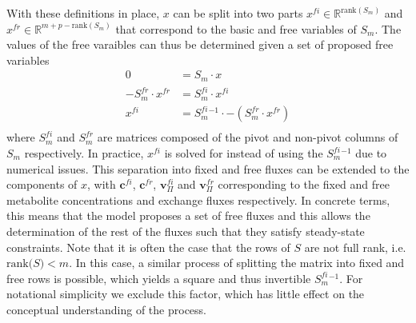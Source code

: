 \documentclass[10pt,letterpaper]{article}
\newcommand{\bc}{\mathbf{c}}
\newcommand{\bv}{\mathbf{v}}
\begin{document}
With these definitions in place, $x$ can be split into two parts $x^{fi} \in \mathbb{R}^{\text{rank}(S_m)}$ and $x^{fr}\in \mathbb{R}^{m+p-\text{rank}(S_m)}$ that correspond to the basic and free variables of $S_m$.
The values of the free varaibles can thus be determined given a set of proposed free variables
\begin{align}
    0 &= S_m\cdot x\\
    -S_m^{fr}\cdot x^{fr} &= S_m^{fi}\cdot  x^{fi}\\
    x^{fi} &= S_m^{fi}^{-1} \cdot -(S_m^{fr}\cdot x^{fr})\\
\end{align}
where $S_m^{fi}$ and $S_m^{fr}$ are matrices composed of the pivot and non-pivot columns of $S_m$ respectively.
In practice, $x^{fi}$ is solved for instead of using the $S_m^{fi}^{-1}$ due to numerical issues.
This separation into fixed and free fluxes can be extended to the components of $x$, with $\bc^{fi}$, $\bc^{fr}$, $\bv_\Pi^{fi}$ and $\bv_\Pi^{fr}$ corresponding to the fixed and free metabolite concentrations and exchange fluxes respectively.
In concrete terms, this means that the model proposes a set of free fluxes and this allows the determination of the rest of the fluxes such that they satisfy steady-state constraints.
Note that it is often the case that the rows of $S$ are not full rank, i.e. $\text{rank(}S\text{)} < m$.
In this case, a similar process of splitting the matrix into fixed and free rows is possible, which yields a square and thus invertible $S_m^{fi}^{-1}$.
For notational simplicity we exclude this factor, which has little effect on the conceptual understanding of the process.
\end{document}
